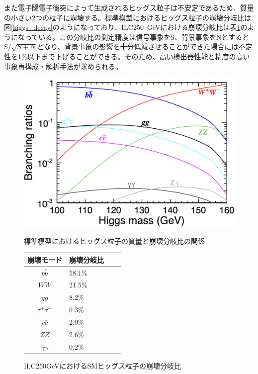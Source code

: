 また電子陽電子衝突によって生成されるヒッグス粒子は不安定であるため、質量の小さい2つの粒子に崩壊する。標準模型におけるヒッグス粒子の崩壊分岐比は図\ref{higgs_decay}のようになっており、ILC250\ GeVにおける崩壊分岐比は表\ref{HiggsDecayonILC}のようになっている。この分岐比の測定精度は信号事象をS、背景事象をNとするとS/$\sqrt{S+N}$となり、背景事象の影響を十分低減させることができた場合には不定性を1\%以下まで下げることができる。そのため、高い検出器性能と精度の高い事象再構成・解析手法が求められる。\\
\begin{figure}[H]
 \begin{minipage}[h]{.45\linewidth}
	\begin{center}
 \includegraphics[keepaspectratio, scale=0.2]
 	{Figure/Introduction/higgs_decay.png}
 		\caption{標準模型におけるヒッグス粒子の質量と崩壊分岐比の関係}
 		\label{higgs_decay}
	\end{center}
 \end{minipage}
 \hfill
\begin{minipage}[h]{.45\linewidth}
\def\@captype{table}
 \centering
  \begin{tabular}{clll}
   \hline
   崩壊モード & 崩壊分岐比\\
   \hline \hline
   $b\bar{b}$ & 58.1\%\\
   $WW$ & 21.5\%\\
   $gg$ & 8.2\%\\
   ${\tau}^+ {\tau}^-$ & 6.3\%\\
   $c \bar{c}$ & 2.9\%\\
   $ZZ$ & 2.6\%\\
   $\gamma \gamma$ & 0.2\%\\
   \hline
  \end{tabular}
   \caption{ILC250GeVにおけるSMヒッグス粒子の崩壊分岐比}
   \label{HiggsDecayonILC}
 \end{minipage}
 \end{figure}
